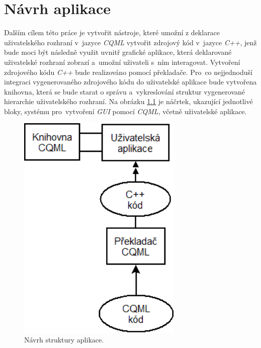 \documentclass[11pt,twoside,a4paper]{book}
\begin{document}
\chapter{\label{CH:appDesign}Návrh aplikace}
Dalším cílem této práce je vytvořit nástroje, které umožní z deklarace uživatelského rozhraní v~jazyce \textit{CQML} vytvořit zdrojový kód v~jazyce \textit{C++}, jenž bude moci být následně využit uvnitř grafické aplikace, která deklarované uživatelské rozhraní zobrazí a~umožní uživateli s~ním interagovat. Vytvoření zdrojového kódu \textit{C++} bude realizováno pomocí překladače. Pro~co nejjednoduší integraci vygenerovaného zdrojového kódu do uživatelské aplikace bude vytvořena knihovna, která se bude starat o správu a~vykreslování struktur vygenerované hierarchie uživatelského rozhraní. 
Na obrázku \ref{fig:structure1} je náčrtek, ukazující jednotlivé bloky, systému pro~vytvoření \textit{GUI} pomocí \textit{CQML}, včetně uživatelské aplikace.  

\begin{figure}[!ht]
\begin{center}
  \includegraphics[width=0.7\textwidth]{Diagram1}
\caption{{\label{fig:structure1}}Návrh struktury aplikace.}
\end{center}
\end{figure}
\end{document}
